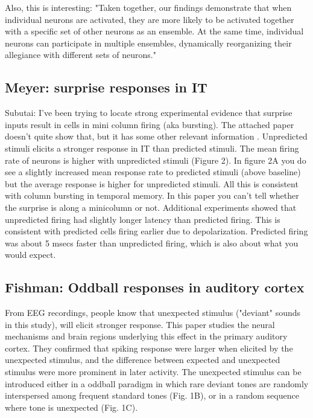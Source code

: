 \documentclass{article} %
\begin{document}
Also, this is interesting: "Taken together, our findings demonstrate that when
individual neurons are activated, they are more likely to be activated together
with a specific set of other neurons as an ensemble. At the same time,
individual neurons can participate in multiple ensembles, dynamically
reorganizing their allegiance with different sets of neurons."

\subsection{Meyer: surprise responses in IT}

Subutai: I've been trying to locate strong experimental evidence that surprise
inputs result in cells in mini column firing (aka bursting).  The attached paper
doesn't quite show that, but it has some other relevant information
\cite{Meyer2011}.  Unpredicted stimuli elicits a stronger response in IT than
predicted stimuli. The mean firing rate of neurons is higher with unpredicted
stimuli (Figure 2). In figure 2A you do see a slightly increased mean response
rate to predicted stimuli (above baseline) but the average response is higher
for unpredicted stimuli. All this is consistent with column bursting in temporal
memory. In this paper you can't tell whether the surprise is along a minicolumn
or not. Additional experiments showed that unpredicted firing had slightly
longer latency than predicted firing. This is consistent with predicted cells
firing earlier due to depolarization. Predicted firing was about 5 msecs faster
than unpredicted firing, which is also about what you would expect.

\subsection{Fishman: Oddball responses in auditory cortex}
 
From EEG recordings, people know that unexpected stimulus ("deviant" sounds in
this study), will elicit stronger response. This paper \cite{Fishman2012}
studies the neural mechanisms and brain regions underlying this effect in the
primary auditory cortex. They confirmed that spiking response were larger when
elicited by the unexpected stimulus, and the difference between expected and
unexpected stimulus were more prominent in later activity. The unexpected
stimulus can be introduced either in a oddball paradigm in which rare deviant
tones are randomly interspersed among frequent standard tones (Fig. 1B), or in
a random sequence where tone is unexpected (Fig. 1C).
\end{document}

